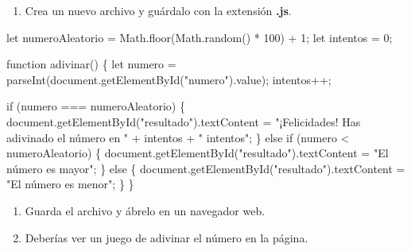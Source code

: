 \documentclass[
  a4paper,
  DIV=11,
  numbers=noendperiod,
  onepage,
  openany]{scrreprt}
\newenvironment{Shaded}{\begin{snugshade}}{\end{snugshade}}
\newcommand{\AttributeTok}[1]{\textcolor[rgb]{0.40,0.45,0.13}{#1}}
\newcommand{\BuiltInTok}[1]{\textcolor[rgb]{0.00,0.23,0.31}{#1}}
\newcommand{\ControlFlowTok}[1]{\textcolor[rgb]{0.00,0.23,0.31}{#1}}
\newcommand{\DecValTok}[1]{\textcolor[rgb]{0.68,0.00,0.00}{#1}}
\newcommand{\FunctionTok}[1]{\textcolor[rgb]{0.28,0.35,0.67}{#1}}
\newcommand{\KeywordTok}[1]{\textcolor[rgb]{0.00,0.23,0.31}{#1}}
\newcommand{\NormalTok}[1]{\textcolor[rgb]{0.00,0.23,0.31}{#1}}
\newcommand{\OperatorTok}[1]{\textcolor[rgb]{0.37,0.37,0.37}{#1}}
\newcommand{\PreprocessorTok}[1]{\textcolor[rgb]{0.68,0.00,0.00}{#1}}
\newcommand{\StringTok}[1]{\textcolor[rgb]{0.13,0.47,0.30}{#1}}
\providecommand{\tightlist}{%
  \setlength{\itemsep}{0pt}\setlength{\parskip}{0pt}}\usepackage{longtable,booktabs,array}
\begin{document}
\begin{enumerate}
\def\labelenumi{\arabic{enumi}.}
\setcounter{enumi}{3}
\tightlist
\item
  Crea un nuevo archivo y guárdalo con la extensión \textbf{.js}.
\end{enumerate}

\begin{Shaded}
\begin{Highlighting}[]
\KeywordTok{let}\NormalTok{ numeroAleatorio }\OperatorTok{=} \BuiltInTok{Math}\OperatorTok{.}\FunctionTok{floor}\NormalTok{(}\BuiltInTok{Math}\OperatorTok{.}\FunctionTok{random}\NormalTok{() }\OperatorTok{*} \DecValTok{100}\NormalTok{) }\OperatorTok{+} \DecValTok{1}\OperatorTok{;}
\KeywordTok{let}\NormalTok{ intentos }\OperatorTok{=} \DecValTok{0}\OperatorTok{;}

\KeywordTok{function} \FunctionTok{adivinar}\NormalTok{() \{}
    \KeywordTok{let}\NormalTok{ numero }\OperatorTok{=} \PreprocessorTok{parseInt}\NormalTok{(}\BuiltInTok{document}\OperatorTok{.}\FunctionTok{getElementById}\NormalTok{(}\StringTok{"numero"}\NormalTok{)}\OperatorTok{.}\AttributeTok{value}\NormalTok{)}\OperatorTok{;}
\NormalTok{    intentos}\OperatorTok{++;}

    \ControlFlowTok{if}\NormalTok{ (numero }\OperatorTok{===}\NormalTok{ numeroAleatorio) \{}
        \BuiltInTok{document}\OperatorTok{.}\FunctionTok{getElementById}\NormalTok{(}\StringTok{"resultado"}\NormalTok{)}\OperatorTok{.}\AttributeTok{textContent} \OperatorTok{=} \StringTok{"¡Felicidades! Has adivinado el número en "} \OperatorTok{+}\NormalTok{ intentos }\OperatorTok{+} \StringTok{" intentos"}\OperatorTok{;}
\NormalTok{    \} }\ControlFlowTok{else} \ControlFlowTok{if}\NormalTok{ (numero }\OperatorTok{\textless{}}\NormalTok{ numeroAleatorio) \{}
        \BuiltInTok{document}\OperatorTok{.}\FunctionTok{getElementById}\NormalTok{(}\StringTok{"resultado"}\NormalTok{)}\OperatorTok{.}\AttributeTok{textContent} \OperatorTok{=} \StringTok{"El número es mayor"}\OperatorTok{;}
\NormalTok{    \} }\ControlFlowTok{else}\NormalTok{ \{}
        \BuiltInTok{document}\OperatorTok{.}\FunctionTok{getElementById}\NormalTok{(}\StringTok{"resultado"}\NormalTok{)}\OperatorTok{.}\AttributeTok{textContent} \OperatorTok{=} \StringTok{"El número es menor"}\OperatorTok{;}
\NormalTok{    \}}
\NormalTok{\}}
\end{Highlighting}
\end{Shaded}

\begin{enumerate}
\def\labelenumi{\arabic{enumi}.}
\setcounter{enumi}{4}
\item
  Guarda el archivo y ábrelo en un navegador web.
\item
  Deberías ver un juego de adivinar el número en la página.
\end{enumerate}
\end{document}

